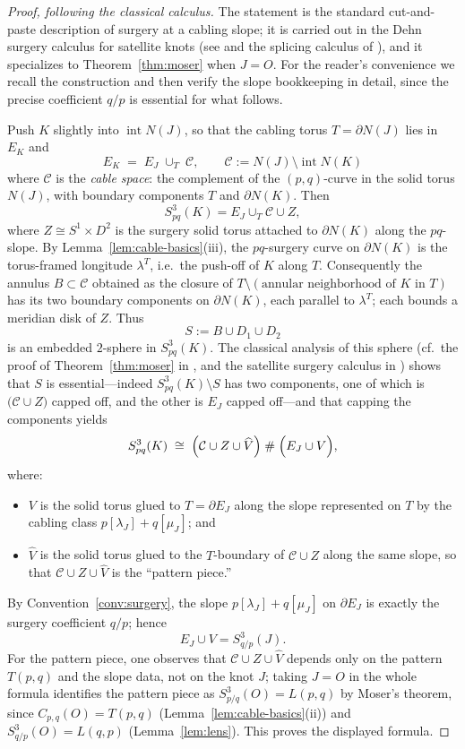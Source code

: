 \documentclass[11pt]{article}
\theoremstyle{definition}
\theoremstyle{remark}
\numberwithin{equation}{section}
\begin{document}
\begin{proof}[Proof, following the classical calculus]
The statement is the standard cut-and-paste description of surgery at a
cabling slope; it is carried out in the Dehn surgery calculus for
satellite knots (see \cite[Chapter~9]{Ro90} and the splicing calculus of
\cite{EN85}), and it specializes to Theorem~\ref{thm:moser} when
$J=O$.  For the reader's convenience we recall the construction and then
verify the slope bookkeeping in detail, since the precise coefficient
$q/p$ is essential for what follows.

Push $K$ slightly into $\operatorname{int}N(J)$, so that the cabling
torus $T=\partial N(J)$ lies in $E_{K}$ and
\[
E_{K}\;=\;E_{J}\;\cup_{T}\;\mathcal{C},
\qquad
\mathcal{C}:=N(J)\setminus\operatorname{int}N(K)
\]
where $\mathcal{C}$ is the \emph{cable space}: the complement of the
$(p,q)$-curve in the solid torus $N(J)$, with boundary components $T$ and
$\partial N(K)$.  Then
\[
S^{3}_{pq}(K)=E_{J}\cup_{T}\mathcal{C}\cup Z,
\]
where $Z\cong S^{1}\times D^{2}$ is the surgery solid torus attached to
$\partial N(K)$ along the $pq$-slope.  By
Lemma~\ref{lem:cable-basics}(iii), the $pq$-surgery curve on
$\partial N(K)$ is the torus-framed longitude $\lambda^{T}$, i.e.\ the
push-off of $K$ along $T$.  Consequently the annulus
$B\subset\mathcal{C}$ obtained as the closure of
$T\setminus(\text{annular neighborhood of }K\text{ in }T)$ has its two
boundary components on $\partial N(K)$, each parallel to $\lambda^{T}$;
each bounds a meridian disk of $Z$.  Thus
\[
S:=B\cup D_{1}\cup D_{2}
\]
is an embedded $2$-sphere in $S^{3}_{pq}(K)$.  The classical analysis of
this sphere (cf.\ the proof of Theorem~\ref{thm:moser} in
\cite{Mos71}, and the satellite surgery calculus in
\cite{Ro90,EN85}) shows that $S$ is essential---indeed
$S^{3}_{pq}(K)\setminus S$ has two components, one of which is
$\bigl(\mathcal{C}\cup Z\bigr)$ capped off, and the other is $E_{J}$
capped off---and that capping the components yields
\[
S^{3}_{pq}(K)\;\cong\;\Bigl(\mathcal{C}\cup Z\cup \widehat{V}\Bigr)\;\#\;
\Bigl(E_{J}\cup V\Bigr),
\]
where:
\begin{itemize}
\item $V$ is the solid torus glued to $T=\partial E_{J}$ along the slope
represented on $T$ by the cabling class
$p[\lambda_{J}]+q[\mu_{J}]$; and
\item $\widehat{V}$ is the solid torus glued to the $T$-boundary of
$\mathcal{C}\cup Z$ along the same slope, so that
$\mathcal{C}\cup Z\cup\widehat{V}$ is the ``pattern piece.''
\end{itemize}
By Convention~\ref{conv:surgery}, the slope
$p[\lambda_{J}]+q[\mu_{J}]$ on $\partial E_{J}$ is exactly the surgery
coefficient $q/p$; hence
\[
E_{J}\cup V=S^{3}_{q/p}(J).
\]
For the pattern piece, one observes that
$\mathcal{C}\cup Z\cup\widehat{V}$ depends only on the pattern
$T(p,q)$ and the slope data, not on the knot $J$; taking $J=O$ in the
whole formula identifies the pattern piece as $S^{3}_{p/q}(O)=L(p,q)$ by
Moser's theorem, since $C_{p,q}(O)=T(p,q)$
(Lemma~\ref{lem:cable-basics}(ii)) and
$S^{3}_{q/p}(O)=L(q,p)$ (Lemma~\ref{lem:lens}).  This proves the
displayed formula.


\end{proof}
\end{document}
